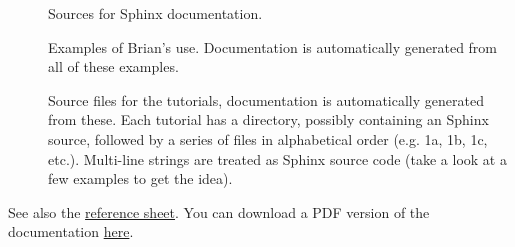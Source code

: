 \documentclass[letterpaper,10pt,english]{manual}
\begin{document}
\begin{description}
\item[] \leavevmode
Sources for Sphinx documentation.

\item[] \leavevmode
Examples of Brian's use. Documentation is automatically generated from all
of these examples.

\item[] \leavevmode
Source files for the tutorials, documentation is automatically generated
from these. Each tutorial has a directory, possibly containing an
 Sphinx source, followed by a series of files in
alphabetical order (e.g. 1a, 1b, 1c, etc.). Multi-line strings are treated
as Sphinx source code (take a look at a few examples to get the idea).

\end{description}

See also the \href{http://brian.di.ens.fr//BrianReference.pdf}{reference sheet}.
You can download a PDF
version of the documentation \href{http://brian.di.ens.fr/docs/Brian.pdf}{here}.


\renewcommand{\indexname}{Module Index}
\printmodindex
\renewcommand{\indexname}{Index}
\printindex
\end{document}
